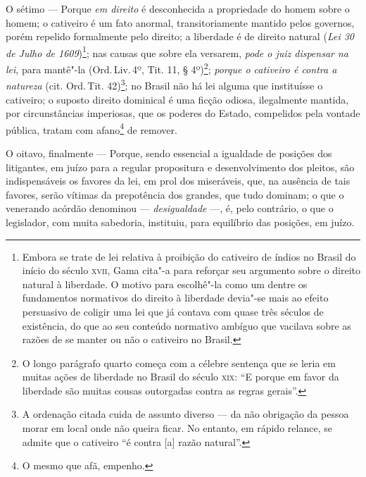 O sétimo --- Porque \emph{em direito} é desconhecida a propriedade do
homem sobre o homem; o cativeiro é um fato anormal, transitoriamente
mantido pelos governos, porém repelido formalmente pelo direito; a
liberdade é de direito natural (\emph{Lei 30 de Julho de
1609})\footnote{Embora se trate de lei relativa à proibição do
  cativeiro de índios no Brasil do início do século \textsc{xvii}, Gama cita"-a
  para reforçar seu argumento sobre o direito natural à liberdade. O
  motivo para escolhê"-la como um dentre os fundamentos normativos do
  direito à liberdade devia"-se mais ao efeito persuasivo de coligir uma
  lei que já contava com quase três séculos de existência, do que ao seu
  conteúdo normativo ambíguo que vacilava sobre as razões de se manter
  ou não o cativeiro no Brasil.}; nas causas que sobre ela versarem,
\emph{pode o juiz dispensar na lei}, para mantê"-la (Ord.\,Liv.\,4º, Tit.
11, § 4º)\footnote{O longo parágrafo quarto começa com a célebre
  sentença que se leria em muitas ações de liberdade no Brasil do século
  \textsc{xix}: ``E porque em favor da liberdade são muitas cousas outorgadas
  contra as regras gerais''.}; \emph{porque o cativeiro é contra a
natureza} (cit. Ord.\,Tit. 42)\footnote{A ordenação citada cuida de
  assunto diverso --- da não obrigação da pessoa morar em local onde não
  queira ficar. No entanto, em rápido relance, se admite que o cativeiro
  ``é contra {[}a{]} razão natural''.}; no Brasil não há lei alguma que
instituísse o cativeiro; o suposto direito dominical é uma ficção
odiosa, ilegalmente mantida, por circunstâncias imperiosas, que os
poderes do Estado, compelidos pela vontade pública, tratam com
afano\footnote{O mesmo que afã, empenho.} de remover.

O oitavo, finalmente --- Porque, sendo essencial a igualdade de
posições dos litigantes, em juízo para a regular propositura e
desenvolvimento dos pleitos, são indispensáveis os favores da lei, em
prol dos miseráveis, que, na ausência de tais favores, serão vítimas da
prepotência dos grandes, que tudo dominam; o que o venerando acórdão
denominou --- \emph{desigualdade} ---, é, pelo contrário, o que o
legislador, com muita sabedoria, instituiu, para equilíbrio das
posições, em juízo.

\asterisc


